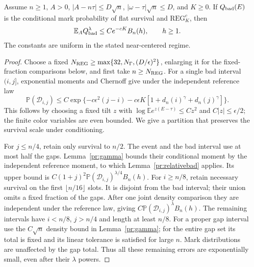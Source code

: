 \begin{lemma}\label{pr:REGlemma}
Assume $n\ge1$, $A>0$, $|A-n\tau|\le D\sqrt n$,
$|\omega-\tau|\sqrt n\le D$, and $K\ge0$.
If $Q_{\rm bad}(E)$ is the conditional mark probability of flat survival
and $\mathrm{REG}_K^c$, then
\begin{equation}
 \mathbb E_A Q_{\rm bad}^\lambda\le C e^{-cK} B_n(h),
 \qquad h\ge1.                                             \label{pr:relativeREG}
\end{equation}
The constants are uniform in the stated near-centered regime.
\end{lemma}
\begin{proof}
Choose a fixed $N_{\rm REG}\ge\max\{32,N_\Gamma,(D/\epsilon)^2\}$,
enlarging it for the fixed-fraction comparisons below, and first take
$n\ge N_{\rm REG}$.
For a single bad interval $(i,j]$, exponential moments and Chernoff give
under the independent reference law
\begin{equation}
 \mathbb P(\mathcal D_{i,j})
 \le C\exp\{-c\epsilon^2(j-i)
          -c\epsilon K[1+d_n(i)^\gamma+d_n(j)^\gamma]\}.
 \label{pr:intervaltail}
\end{equation}
This follows by choosing a fixed tilt $z$ with
$\log\mathbb E e^{z(E-\tau)}\le Cz^2$ and $C|z|\le\epsilon/2$;
the finite color variables are even bounded.
We give a partition that preserves the survival scale under conditioning.

For $j\le n/4$, retain only survival to $n/2$. The event and the bad
interval use at most half the gaps. Lemma~\ref{pr:gamma} bounds their
conditional moment by the independent reference moment, to which
Lemma~\ref{pr:relativebad} applies. Its upper bound is
$C(1+j)^2\mathbb P(\mathcal D_{i,j})^{\lambda/4}B_n(h)$.
For $i\ge n/8$, retain necessary survival on the first $\lfloor n/16\rfloor$
slots. It is disjoint from the bad interval; their union omits a fixed
fraction of the gaps. After one joint density comparison they are
independent under the reference law, giving
$C\mathbb P(\mathcal D_{i,j})^\lambda B_n(h)$.
The remaining intervals have $i<n/8$, $j>n/4$ and length at least $n/8$.
For a proper gap interval use the $C\sqrt n$ density bound in
Lemma~\ref{pr:gamma}; for the entire gap set its total is fixed and its
linear tolerance is satisfied for large $n$. Mark distributions are
unaffected by the gap total. Thus all these remaining errors are
exponentially small, even after their $\lambda$ powers.


\end{proof}
